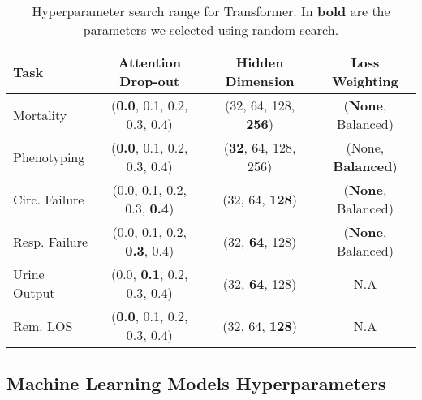 \documentclass{article}
\begin{document}
\begin{table}[tbh!]
    \centering
    \footnotesize
\begin{tabular}{l|c|c|c}

\toprule
Task & Attention Drop-out & Hidden Dimension & Loss Weighting \\
\midrule
\midrule
Mortality & (\textbf{0.0}, 0.1, 0.2, 0.3, 0.4) &  (32, 64, 128, \textbf{256}) & (\textbf{None}, Balanced) \\
Phenotyping & (\textbf{0.0}, 0.1, 0.2, 0.3, 0.4) &  (\textbf{32}, 64, 128, 256) & (None, \textbf{Balanced}) \\
\midrule
\midrule
Circ. Failure & (0.0, 0.1, 0.2, 0.3, \textbf{0.4}) & (32, 64, \textbf{128}) & (\textbf{None}, Balanced) \\
Resp. Failure & (0.0, 0.1, 0.2, \textbf{0.3}, 0.4) &  (32, \textbf{64}, 128) & (\textbf{None}, Balanced) \\
\midrule
\midrule
Urine Output & (0.0, \textbf{0.1}, 0.2, 0.3, 0.4) &  (32, \textbf{64}, 128) & N.A \\
Rem. LOS  &  (\textbf{0.0}, 0.1, 0.2, 0.3, 0.4) & (32, 64, \textbf{128})  & N.A \\
\bottomrule
\end{tabular}
    \caption{Hyperparameter search range for Transformer. In \textbf{bold} are the parameters we selected using random search. }
    \label{tab:hp-search-transformer_2}
\end{table}


\newpage
\subsection*{Machine Learning Models Hyperparameters}
\end{document}
